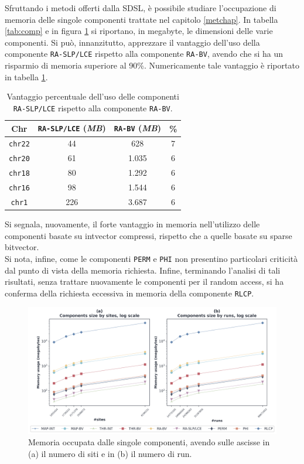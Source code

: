 Sfruttando i metodi offerti dalla SDSL, è possibile studiare
l'occupazione di memoria delle singole componenti trattate nel capitolo
\ref{metchap}. 
In tabella \ref{tab:comp} e in figura \ref{fig:comp}
si riportano, in megabyte, 
le dimensioni delle varie componenti. Si può,
innanzitutto, apprezzare il vantaggio dell'uso della componente
\texttt{RA-SLP/LCE} rispetto alla 
componente \texttt{RA-BV}, avendo che si ha un risparmio di memoria superiore al
90\%. Numericamente tale vantaggio è riportato in tabella
\ref{tab:slppanel}.
\begin{table}
  \centering
  \caption{Vantaggio percentuale dell'uso delle componenti \texttt{RA-SLP/LCE}
    rispetto alla componente \texttt{RA-BV}.}
  \begin{tabular}{c||c|c|c}
    \textbf{Chr} & \textbf{\texttt{RA-SLP/LCE}
                                          (\textit{MB})}
    & \textbf{\texttt{RA-BV} (\textit{MB})} & \textbf{\%}\\
    \hline
    \hline
    \texttt{chr22} & 44 & 628 & 7\\
    \texttt{chr20} & 61 & 1.035 & 6\\
    \texttt{chr18} & 80 & 1.292 & 6\\
    \texttt{chr16} & 98 & 1.544 & 6\\
    \texttt{chr1} & 226 & 3.687 & 6\\
  \end{tabular}
  \label{tab:slppanel}
\end{table}
Si segnala, nuovamente, il
forte vantaggio in memoria nell'utilizzo delle componenti basate su intvector
compressi, rispetto che a quelle basate su sparse bitvector.\\
Si nota, infine, come le componenti \texttt{PERM} e \texttt{PHI} non
presentino particolari criticità dal punto di vista della memoria
richiesta. Infine, terminando l'analisi di tali risultati, senza trattare
nuovamente le componenti per il random access, si ha conferma della
richiesta eccessiva in memoria della componente \texttt{RLCP}.
\begin{figure}
  \centering
    \includegraphics[width=\linewidth]{img/comp_mem.png}
  \caption{Memoria occupata dalle singole componenti, avendo sulle ascisse in
    (a) il numero di siti e in (b) il numero di run. }
  \label{fig:comp}
\end{figure}

